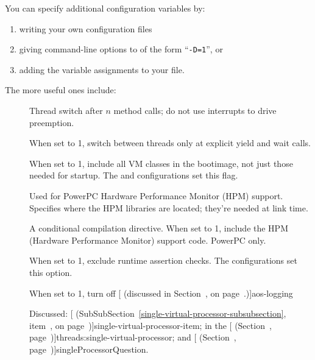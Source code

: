 You can specify additional configuration variables by:
\begin{enumerate}
\item writing your own
configuration files
\item giving command-line options to
 of the form
``\texttt{-D}\texttt{=1}'', or
\item adding the variable assignments to your  file.
\end{enumerate}
The more useful ones include:
\begin{description}
\item[]
Thread switch after $n$ method calls; do not use interrupts to drive
preemption.

\item[]
  When set to 1, switch between threads only at explicit yield and wait calls.

\item[]  When set to 1, include
  all VM classes in the bootimage, not just those needed for startup.  
  The  and  configurations set this flag.

\item[]  Used for PowerPC Hardware%
  Performance Monitor (HPM) support.  Specifies where the HPM
  libraries are located; they're needed at link time.

\item[]%
  A conditional compilation directive.  When set to 1, include the HPM
  (Hardware Performance Monitor) support code.  PowerPC only.

\item[]
 When set to 1, exclude runtime assertion checks.  The
  configurations set this option.

\item[] When set to 1, turn off [ (discussed in Section~\Ref, on page~\Pageref.)]{aos-logging}

\item[]
Discussed: [
  (SubSubSection~\ref{single-virtual-processor-subsubsection},
  item~\Ref, on page~\Pageref)]{single-virtual-processor-item}; in the
[ (Section~\Ref, page~\Pageref)]{threads:single-virtual-processor};
and [ (Section~\Ref, page~\Pageref)]{singleProcessorQuestion}.

\end{description}

